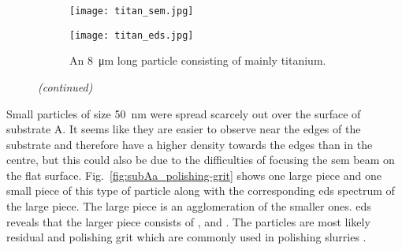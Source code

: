 \begin{figure}[htbp]
\ContinuedFloat
    \centering
    \begin{subfigure}[t]{\textwidth}
          \begin{minipage}[t]{0.49\linewidth}
            \centering
            \texttt{[image: titan\_sem.jpg]}
          \end{minipage}
          \hspace{0.02\linewidth}
          \begin{minipage}[t]{0.49\linewidth}
            \centering
            \texttt{[image: titan\_eds.jpg]}
          \end{minipage}
        \caption{An \SI{8}{\micro\metre} long particle consisting of mainly titanium.}\label{fig:subAa_titanium-particle}
    \end{subfigure}
    \captionsetup{list=no}
    \caption{\emph{(continued)}}
\end{figure}

Small particles of size \SI{50}{\nano\metre} were spread scarcely out over the surface of substrate A. It seems like they are easier to observe near the edges of the substrate and therefore have a higher density towards the edges than in the centre, but this could also be due to the difficulties of focusing the \ac{sem} beam on the flat surface. Fig.~\ref{fig:subAa_polishing-grit} shows one large piece and one small piece of this type of particle along with the corresponding \ac{eds} spectrum of the large piece. The large piece is an agglomeration of the smaller ones. \ac{eds} reveals that the larger piece consists of ,  and . The particles are most likely residual  and  polishing grit which are commonly used in polishing slurries \citep{benson2015as-received}.

\begin{comment}
\begin{figure}[htbp]
    \centering
    \subfigure[SEM image at a magnification of 150000$\times$.]{\texttt{[image: substrateA\_a2\_m006.jpg]}\label{fig:substrateA_a2_m006}}
    \subfigure[EDS.]{\texttt{[image: subA\_eds\_alumina02.jpg]}\label{fig:subA_eds_alumina02}}
    \caption[ SEM image and EDS spectrum of a particle on substrate A.]{High resolution scanning electron microscopy (SEM) image of one large and small piece of particles on substrate A and the corresponding \acf{eds} spectrum of the large piece.}
    \label{fig:subA_alumina}
\end{figure}
\end{comment}


